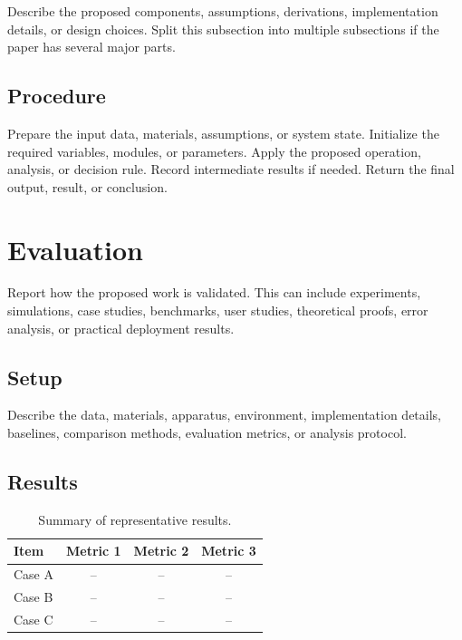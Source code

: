 \documentclass[letterpaper,10pt,journal,twoside]{IEEEtran}
\begin{document}
Describe the proposed components, assumptions, derivations, implementation
details, or design choices. Split this subsection into multiple subsections if
the paper has several major parts.

\subsection{Procedure}
\label{subsec:procedure}

\begin{algorithm}[t]
\caption{General Procedure}
\label{alg:procedure}
\begin{algorithmic}[1]
\STATE Prepare the input data, materials, assumptions, or system state.
\STATE Initialize the required variables, modules, or parameters.
    \STATE Apply the proposed operation, analysis, or decision rule.
    \STATE Record intermediate results if needed.
\ENDFOR
\STATE Return the final output, result, or conclusion.
\end{algorithmic}
\end{algorithm}

\section{Evaluation}
\label{sec:evaluation}

Report how the proposed work is validated. This can include experiments,
simulations, case studies, benchmarks, user studies, theoretical proofs, error
analysis, or practical deployment results.

\subsection{Setup}
\label{subsec:setup}

Describe the data, materials, apparatus, environment, implementation details,
baselines, comparison methods, evaluation metrics, or analysis protocol.

\subsection{Results}
\label{subsec:results}

\begin{table}[t]
\centering
\caption{Summary of representative results.}
\label{tab:main_results}
\begin{tabular}{lccc}
\toprule
Item & Metric 1 & Metric 2 & Metric 3 \\
\midrule
Case A & -- & -- & -- \\
Case B & -- & -- & -- \\
Case C & -- & -- & -- \\
\bottomrule
\end{tabular}
\end{table}
\end{document}
